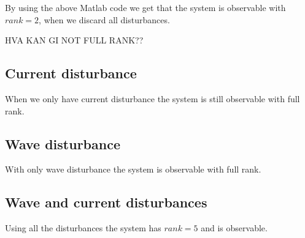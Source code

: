 By using the above Matlab code we get that the system is observable with $rank = 2$, when we discard all disturbances.

HVA KAN GI NOT FULL RANK??
\subsection{Current disturbance}
When we only have current disturbance the system is still observable with full rank.  

\subsection{Wave disturbance}
With only wave disturbance the system is observable with full rank.

\subsection{Wave and current disturbances}
Using all the disturbances the system has $rank = 5$ and is observable.